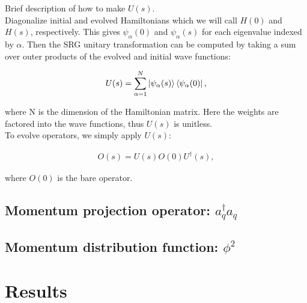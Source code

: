 \documentclass[preprintnumbers,floatfix,aps,prc,preprint,nofootinbib]{revtex4-1}
\begin{document}
Brief description of how to make $U(s)$.
\\

Diagonalize initial and evolved Hamiltonians which we will call $H(0)$ and $H(s)$, respectively. This gives $\psi_{\alpha}(0)$ and $\psi_{\alpha}(s)$ for each eigenvalue indexed by $\alpha$. Then the SRG unitary transformation can be computed by taking a sum over outer products of the evolved and initial wave functions:

\begin{eqnarray}
	\label{eq:unitary_transformation}
	U(s) = \sum_{\alpha=1}^{N} \ket{\psi_{\alpha}(s)} \bra{\psi_{\alpha}(0)},
\end{eqnarray}

where N is the dimension of the Hamiltonian matrix. Here the weights are factored into the wave functions, thus $U(s)$ is unitless.
\\

To evolve operators, we simply apply $U(s)$:

\begin{eqnarray}
	\label{eq:evolved_operator}
	O(s) = U(s) O(0) U^{\dagger}(s),
\end{eqnarray}

where $O(0)$ is the bare operator.


\subsection{Momentum projection operator: $a^{\dagger}_q a_q$}
\label{sec:momentum_proj_operator}


\subsection{Momentum distribution function: $\phi^2$}
\label{sec:momentum_dist_funcs}


\section{Results}
\label{sec:results}
\end{document}
